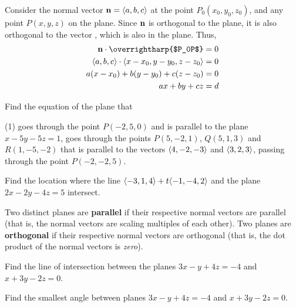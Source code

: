 \documentclass[mathNotesPreamble]{subfiles}
\begin{document}
  Consider the normal vector ${\mathbf{n}}={\left\langle a,b,c \right\rangle}$ at the point $P_0(x_0,y_0,z_0)$, and any point $P(x,y,z)$ on the plane. Since ${\mathbf{n}}$ is orthogonal to the plane, it is also orthogonal to the vector , which is also in the plane. Thus,
    \begin{align*}
      \vecn\cdot\textnormal{\overrightharp{$P_0P$}}&=0\\
      \bracket{a,b,c}\cdot\bracket{x-x_0,y-y_0,z-z_0}&=0\\
      a(x-x_0)+b(y-y_0)+c(z-z_0)&=0\\
      ax+by+cz&=d
    \end{align*}

  \noindent
  \pagebreak
  \begin{ex*}
    Find the equation of the plane that
    \begin{tasks}[after-item-skip=\stretch{1}, label=\textbullet](1)
      \task goes through the point $P(-2,5,0)$ and is parallel to the plane $x-5y-5z=1$,
      \task goes through the points $P(5,-2,1)$, $Q(5,1,3)$ and $R(1,-5,-2)$
      \task that is parallel to the vectors ${\left\langle 4,-2,-3 \right\rangle}$ and ${\left\langle 3,2,3 \right\rangle}$, passing through the point $P(-2,-2,5)$.
    \end{tasks}
  \end{ex*}
  \pagebreak

  \begin{ex*}
    Find the location where the line ${\left\langle -3,1,4 \right\rangle}+t{\left\langle -1,-4,2 \right\rangle}$ and the plane $2x-2y-4z=5$ intersect.
  \end{ex*}

  \begin{defn*}
    Two distinct planes are \textbf{parallel} if their respective normal vectors are parallel (that is, the normal vectors are scaling multiples of each other). Two planes are \textbf{orthogonal} if their respective normal vectors are orthogonal (that is, the dot product of the normal vectors is \textit{zero}).
  \end{defn*}
  \begin{ex*}
    Find the line of intersection between the planes $3x-y+4z=-4$ and $x+3y-2z=0$.
  \end{ex*}
  \pagebreak

  \begin{ex*}
    Find the smallest angle between planes $3x-y+4z=-4$ and $x+3y-2z=0$.
  \end{ex*}

  \pagebreak
  
\end{document}
